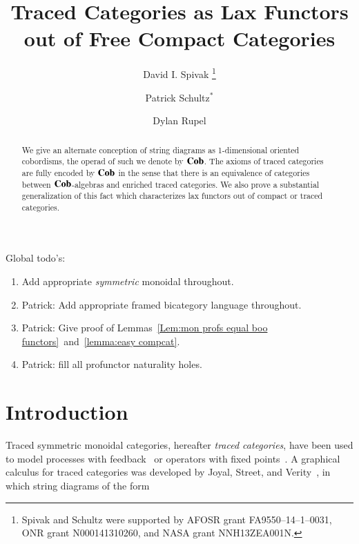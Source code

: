 \documentclass[12pt,oneside,article,draft]{memoir}
\title{Traced Categories as Lax Functors out of Free Compact Categories}
\author{
	David I. Spivak
		\thanks{Spivak and Schultz were supported by AFOSR grant FA9550--14--1--0031, ONR grant N000141310260, and NASA grant NNH13ZEA001N.}
	\and Patrick Schultz${}^*$%
	\and Dylan Rupel 
}
\begin{document}
\tightlists
\firmlists

\maketitle
\begin{abstract}
	We give an alternate conception of string diagrams as 1-dimensional oriented cobordisms, the operad of such we denote by $\mathbf{Cob}$.
	The axioms of traced categories are fully encoded by $\mathbf{Cob}$ in the sense that there is an equivalence of categories between $\mathbf{Cob}$-algebras and enriched traced categories.
	We also prove a substantial generalization of this fact which characterizes lax functors out of compact or traced categories.
\end{abstract}
Global todo's:
\begin{enumerate}
	\item Add appropriate {\em symmetric\/} monoidal throughout.
	\item Patrick: Add appropriate framed bicategory language throughout.
	\item Patrick: Give proof of Lemmas~\ref{Lem:mon profs equal boo functors}~and~\ref{lemma:easy compcat}.
	\item Patrick: fill all profunctor naturality holes.
\end{enumerate}

\setcounter{tocdepth}{1}
\tableofcontents*


\chapter{Introduction}

Traced symmetric monoidal categories, hereafter \emph{traced categories}, have been used to model processes with feedback~\cite{Abramsky1} or operators with fixed points~\cite{PontoShulman}.
A graphical calculus for traced categories was developed by Joyal, Street, and Verity~\cite{JoyalStreetVerity}, in which string diagrams of the form
\end{document}
